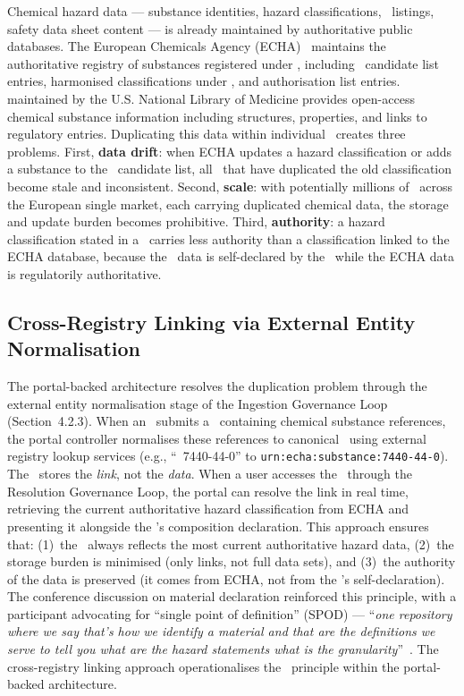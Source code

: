 Chemical hazard data --- substance identities, hazard classifications, \SVHC\
listings, safety data sheet content --- is already maintained by authoritative
public databases. The European Chemicals Agency (ECHA)~\cite{echa} maintains the
authoritative registry of substances registered under \REACH, including \SVHC\
candidate list entries, harmonised classifications under \CLP, and authorisation
list entries. \PubChem~\cite{pubchem} maintained by the U.S. National Library of
Medicine provides open-access chemical substance information including
structures, properties, and links to regulatory entries. Duplicating this data
within individual \DPPs\ creates three problems. First, \textbf{data drift}:
when ECHA updates a hazard classification or adds a substance to the \SVHC\
candidate list, all \DPPs\ that have duplicated the old classification become
stale and inconsistent. Second, \textbf{scale}: with potentially millions of
\DPPs\ across the European single market, each carrying duplicated chemical
data, the storage and update burden becomes prohibitive. Third,
\textbf{authority}: a hazard classification stated in a \DPP\ carries less
authority than a classification linked to the ECHA database, because the \DPP\
data is self-declared by the \REO\ while the ECHA data is regulatorily
authoritative.

\subsection{Cross-Registry Linking via External Entity Normalisation}

The portal-backed architecture resolves the duplication problem through the
external entity normalisation stage of the Ingestion Governance Loop
(Section~4.2.3). When an \REO\ submits a \DPP\ containing chemical substance
references, the portal controller normalises these references to canonical
\IRIs\ using external registry lookup services (e.g., ``\CAS\ 7440-44-0'' to
\texttt{urn:echa:substance:7440-44-0}). The \DPP\ stores the \textit{link}, not
the \textit{data}. When a user accesses the \DPP\ through the Resolution
Governance Loop, the portal can resolve the link in real time, retrieving the
current authoritative hazard classification from ECHA and presenting it
alongside the \REO's composition declaration. This approach ensures that:
(1)~the \DPP\ always reflects the most current authoritative hazard data,
(2)~the storage burden is minimised (only links, not full data sets), and
(3)~the authority of the data is preserved (it comes from ECHA, not from the
\REO's self-declaration). The conference discussion on material declaration
reinforced this principle, with a participant advocating for ``single point of
definition'' (SPOD) --- ``\textit{one repository where we say that's how we
identify a material and that are the definitions we serve to tell you what are
the hazard statements what is the granularity}''~\cite{dpp4eu2026_day1}. The
cross-registry linking approach operationalises the \SPOD\ principle within the
portal-backed architecture.

